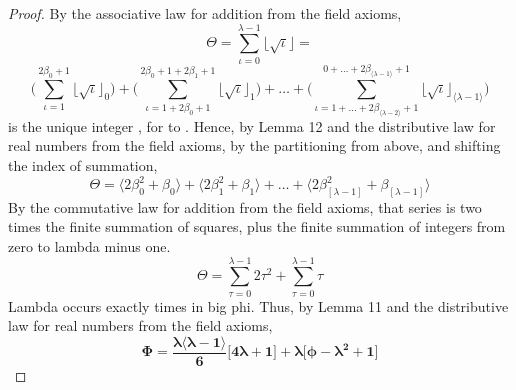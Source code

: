 \documentclass[preview]{standalone}
\begin{document}
\begin{proof}
    By the associative law for addition from the field axioms,
    \begin{equation*}
        \Theta
            = 
        \sum_{\iota=0}^{\lambda - 1} 
                \big \lfloor \sqrt \iota \big \rfloor 
            =
    \end{equation*}
    \begin{equation*}
        \Bigg (
            \sum_{\iota=1}^{ 2 \beta_0 + 1 } 
                    \big \lfloor \sqrt \iota \big \rfloor_0 
        \Bigg )
            +
        \Bigg (
            \sum_{\iota=1 + 2 \beta_0 + 1}^{ 2 \beta_0 + 1 + 2 \beta_1 + 1 } 
                    \big \lfloor \sqrt \iota \big \rfloor_1 
        \Bigg )
            +
        \dots
            +
        \Bigg (
            \sum_{\iota=1 +  \dots + 2 \beta_{\langle \lambda - 2 \rangle} + 1 }
                ^{0 + \dots + 2 \beta_{\langle \lambda - 1 \rangle} + 1} 
                    \big \lfloor \sqrt \iota \big \rfloor_{
                        \langle \lambda - 1 \rangle
                    } 
        \Bigg )
    \end{equation*}
    \bm{$\big \lfloor \sqrt \iota \big \rfloor_\tau$}
    is the unique integer \bm{$\beta_\tau$}, 
    for  to \bm{$\big \langle \lambda - 1 \big \rangle$}.
    Hence, by Lemma 12 and the distributive law for real numbers from the field axioms, 
    by the partitioning from above, and shifting the index of summation,
    \begin{equation*}
        \Theta
            =
        \Big \langle 2 \beta_{0} ^2 + \beta_0 \Big \rangle
            +
        \Big \langle 2 \beta_{1} ^2 + \beta_1 \Big \rangle
            +
        \dots
            +
        \Big \langle 
            2 \beta_{[ \lambda - 1 ]} ^2
                +
            \beta_{[ \lambda - 1 ]}
        \Big \rangle
    \end{equation*}
    By the commutative law for addition from the field axioms,
    that series is two times the finite summation of squares, 
    plus the finite summation of integers from zero to lambda minus one.
    \begin{equation*}
        \Theta
            = 
        \sum_{\tau=0}^{ \lambda - 1 } 2 \tau ^2 
            +
        \sum_{\tau=0}^{ \lambda - 1 } \tau
    \end{equation*}
    Lambda occurs exactly 
    times in big phi.
    Thus, by Lemma 11 and the distributive law for real numbers from the field axioms,
    \begin{equation*}
        \bm{
            \Phi
                =
            \frac{
                \lambda
                \big \langle \lambda - 1 \big \rangle
            }
            {6}
            \Bigg[
                4 \lambda + 1
            \Bigg]
                +
            \lambda
            \Bigg[
                \phi
                    -
                \lambda ^2
                    +
                1
            \Bigg]
        }
    \end{equation*}
\end{proof}
\end{document}
